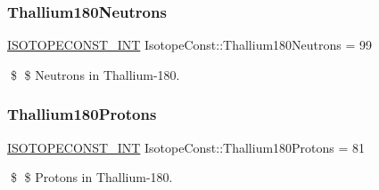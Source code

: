 \subsubsection{\texorpdfstring{Thallium180\+Neutrons}{Thallium180Neutrons}}
{\footnotesize\ttfamily \mbox{\hyperlink{group___isotope_const-_macros_ga5f18360b3e99483a35c32d789e62621c}{I\+S\+O\+T\+O\+P\+E\+C\+O\+N\+S\+T\+\_\+\+I\+NT}} Isotope\+Const\+::\+Thallium180\+Neutrons = 99}

\$ \$ Neutrons in Thallium-\/180. \mbox{\label{group___isotope_const-_thallium-_tl180_gad65cf82c94338b16b76f2825a8fd5342}} 
\subsubsection{\texorpdfstring{Thallium180\+Protons}{Thallium180Protons}}
{\footnotesize\ttfamily \mbox{\hyperlink{group___isotope_const-_macros_ga5f18360b3e99483a35c32d789e62621c}{I\+S\+O\+T\+O\+P\+E\+C\+O\+N\+S\+T\+\_\+\+I\+NT}} Isotope\+Const\+::\+Thallium180\+Protons = 81}

\$ \$ Protons in Thallium-\/180. 